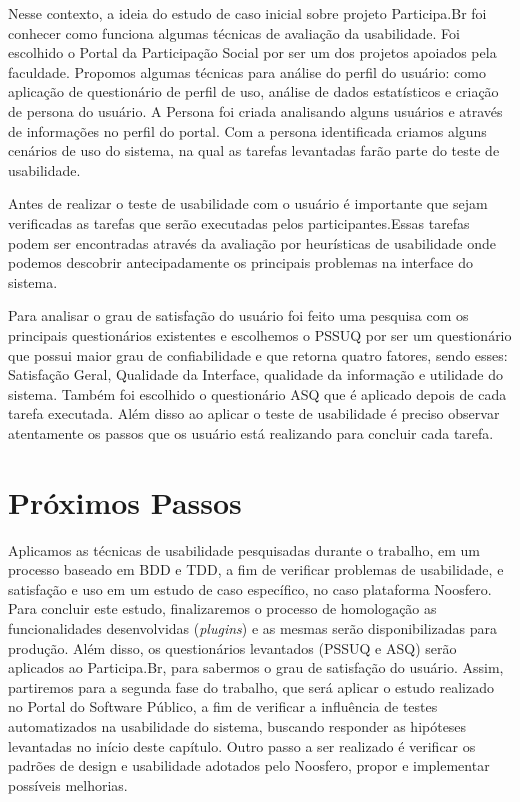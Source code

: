 
Nesse contexto, a ideia do estudo de caso inicial sobre projeto Participa.Br foi conhecer como funciona algumas técnicas de avaliação da usabilidade. Foi escolhido o Portal da Participação Social por ser um dos projetos apoiados pela faculdade.
%
Propomos algumas técnicas para análise do perfil do usuário: como aplicação de questionário de perfil de uso, análise de dados estatísticos e criação de persona do usuário.
%
A Persona foi criada analisando alguns usuários e através de informações no perfil do portal.
%
Com a persona identificada criamos alguns cenários de uso do sistema, na qual as tarefas levantadas farão parte do teste de usabilidade.

Antes de realizar o teste de usabilidade com o usuário é importante que sejam verificadas as tarefas que serão executadas pelos participantes.Essas tarefas podem ser encontradas através da avaliação por heurísticas de usabilidade onde podemos descobrir antecipadamente os principais problemas na interface do sistema.

Para analisar o grau de satisfação do usuário foi feito uma pesquisa com os principais questionários existentes e escolhemos o PSSUQ por ser um questionário que possui maior grau de confiabilidade e que retorna quatro fatores, sendo esses: Satisfação Geral, Qualidade da Interface, qualidade da informação e utilidade do sistema.
%
Também foi escolhido o questionário ASQ que é aplicado depois de cada tarefa executada. Além disso ao aplicar o teste de usabilidade é preciso observar atentamente os passos que os usuário está realizando para concluir cada tarefa.


\section{Próximos Passos}

Aplicamos as técnicas de usabilidade pesquisadas durante o trabalho, em um processo baseado em BDD e TDD, a fim de verificar problemas de usabilidade, e satisfação e uso em um estudo de caso específico, no caso plataforma Noosfero. 
%
Para concluir este estudo, finalizaremos o processo de  homologação as funcionalidades desenvolvidas (\textit{plugins}) e as mesmas serão disponibilizadas para produção.
%
Além disso, os questionários levantados (PSSUQ e ASQ) serão aplicados ao Participa.Br, para sabermos o grau de satisfação do usuário. 
%
Assim, partiremos para a segunda fase do trabalho, que será aplicar o estudo realizado  no Portal do Software Público, a fim de verificar a influência de testes automatizados na usabilidade do sistema, buscando responder as hipóteses levantadas no início deste capítulo. Outro passo a ser realizado é verificar os padrões de design e usabilidade adotados pelo Noosfero, propor e implementar possíveis melhorias.

